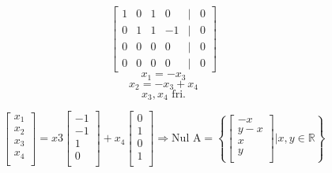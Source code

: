 \documentclass[12pt,norsk,a4paper]{article}
\begin{document}
\begin{equation*}
\begin{bmatrix}
1&0&1&0&|&0\\
0&1&1&-1&|&0\\
0&0&0&0&|&0\\
0&0&0&0&|&0
\end{bmatrix}
\end{equation*}
\[x_1 = -x_3\]
\[x_2 = -x_3 + x_4\]
\[x_3, x_4 \textrm{ fri.} \]

\begin{equation*}
\begin{bmatrix}
x_1\\ x_2\\ x_3\\ x_4\\
\end{bmatrix} 
= 
x3 
\begin{bmatrix}
-1\\ -1\\ 1\\ 0\\ 
\end{bmatrix} 
+ x_4
\begin{bmatrix}
0\\ 1\\ 0\\ 1\\ 
\end{bmatrix} 
\Rightarrow 
\textrm{Nul A} = 
\left\{{
\begin{bmatrix}
-x\\ y-x\\ x\\ y\\ 
\end{bmatrix} | x, y \in \mathbb{R}}\right\}
\end{equation*}

\end{document}

